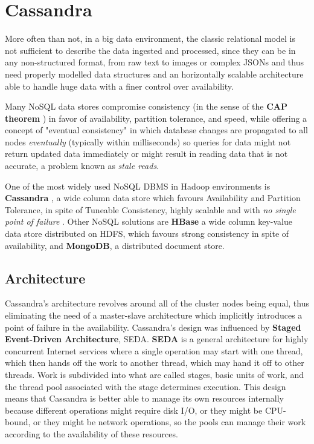 \section{Cassandra}

More often than not, in a big data environment, the classic relational model is not sufficient to describe the data ingested and processed, since they can be in any non-structured format, from raw text to images or complex JSONs and thus need properly modelled data structures and an horizontally scalable architecture able to handle huge data with a finer control over availability.

Many NoSQL data stores compromise consistency (in the sense of the \textbf{CAP theorem} \cite{Gilbert:2002:BCF:564585.564601}) in favor of availability, partition tolerance, and speed, while offering a concept of "eventual consistency" in which database changes are propagated to all nodes \textit{eventually} (typically within milliseconds) so queries for data might not return updated data immediately or might result in reading data that is not accurate, a problem known as \textit{stale reads}.

One of the most widely used NoSQL DBMS in Hadoop environments is \textbf{Cassandra} , a wide column data store which favours Availability and Partition Tolerance, in spite of Tuneable Consistency, highly scalable and with \textit{no single point of failure} \cite{Lakshman:2010:CDS:1773912.1773922}. Other NoSQL solutions are \textbf{HBase} a wide column key-value data store distributed on HDFS, which favours strong consistency in spite of availability, and \textbf{MongoDB}, a distributed document store.

\subsection{Architecture}

Cassandra's architecture revolves around all of the cluster nodes being equal, thus eliminating the need of a master-slave architecture which implicitly introduces a point of failure in the availability. Cassandra’s design was influenced by \textbf{Staged Event-Driven Architecture}, SEDA. \textbf{SEDA} is a general architecture for highly concurrent Internet services \cite{Welsh:2001:SAW:502059.502057} where a single operation may start with one thread, which then hands off the work to another thread, which may hand it off to other threads. Work is subdivided into what are called stages, basic units of work, and the thread pool associated with the stage determines execution. This design means that Cassandra is better able to manage its own resources internally because different operations might require disk I/O, or they might be CPU-bound, or they might be network operations, so the pools can manage their work according to the availability of these resources.

